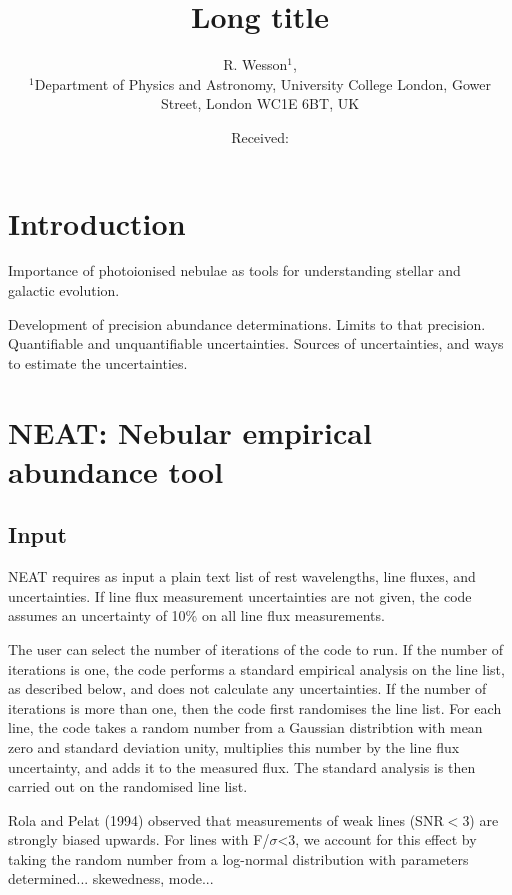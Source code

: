 \documentclass[]{../MNtemplate/mn2e}
\title[Short title]
{Long title}
\author[R. Wesson et al.]
{R. Wesson$^1$,  \\
$^1$Department of Physics and Astronomy, University College London, Gower Street, London WC1E 6BT, UK\\
}
\date{Received:}
\begin{document}
\maketitle

\begin{abstract}

\end{abstract}
 
\begin{keywords}

\end{keywords}

\section{Introduction}

Importance of photoionised nebulae as tools for understanding stellar and galactic evolution.

Development of precision abundance determinations.  Limits to that precision.  Quantifiable and unquantifiable uncertainties.  Sources of uncertainties, and ways to estimate the uncertainties.

\section{NEAT: Nebular empirical abundance tool}

\subsection{Input}

NEAT requires as input a plain text list of rest wavelengths, line fluxes, and uncertainties.  If line flux measurement uncertainties are not given, the code assumes an uncertainty of 10\% on all line flux measurements.

The user can select the number of iterations of the code to run.  If the number of iterations is one, the code performs a standard empirical analysis on the line list, as described below, and does not calculate any uncertainties.  If the number of iterations is more than one, then the code first randomises the line list.  For each line, the code takes a random number from a Gaussian distribtion with mean zero and standard deviation unity, multiplies this number by the line flux uncertainty, and adds it to the measured flux.  The standard analysis is then carried out on the randomised line list.

Rola and Pelat (1994) observed that measurements of weak lines (SNR$<$3) are strongly biased upwards.  For lines with F/$\sigma$<3, we account for this effect by taking the random number from a log-normal distribution with parameters determined... skewedness, mode...
\end{document}
